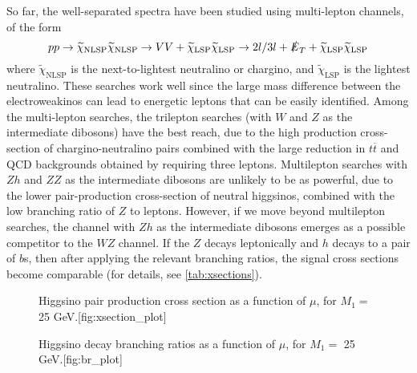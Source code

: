 So far, the well-separated spectra have been studied using multi-lepton channels, of the form 
\[pp\rightarrow \widetilde{\chi}_\text{NLSP}\widetilde{\chi}_\text{NLSP}\rightarrow VV + \widetilde{\chi}_\text{LSP}\widetilde{\chi}_\text{LSP}\rightarrow 2l/3l + \slashed{E}_T +  \widetilde{\chi}_\text{LSP}\widetilde{\chi}_\text{LSP}\]
where $\widetilde{\chi}_\text{NLSP}$ is the next-to-lightest neutralino or chargino, and $\widetilde{\chi}_\text{LSP}$ is the lightest neutralino. These searches work well since the large mass difference between the electroweakinos can lead to energetic leptons that can be easily identified. Among the multi-lepton searches, the trilepton searches (with $W$ and $Z$ as the intermediate dibosons) have the best reach, due to the high production cross-section of chargino-neutralino pairs combined with the large reduction in $t\overline{t}$ and QCD backgrounds obtained by requiring three leptons. Multilepton searches with $Zh$ and $ZZ$ as the intermediate dibosons are unlikely to be as powerful, due to the lower pair-production cross-section of neutral higgsinos, combined with the low branching ratio of $Z$ to leptons. However, if we move beyond multilepton searches, the channel with $Zh$ as the intermediate dibosons emerges as a possible competitor to the $WZ$ channel. If the $Z$ decays leptonically and $h$ decays to a pair of $b$s, then after applying the relevant branching ratios, the signal cross sections become comparable (for details, see \autoref{tab:xsections}). 
\begin{figure}
    \centering
    \begin{sidecaption}{Higgsino pair production cross section as a function of $\mu$, for $M_1=$ 25 GeV.}[fig:xsection_plot]

\end{sidecaption}
\end{figure}
\begin{figure}
    \centering
    \begin{sidecaption}{Higgsino decay branching ratios as a function of $\mu$, for $M_1=$ 25 GeV.}[fig:br_plot]

\end{sidecaption}
\end{figure}


